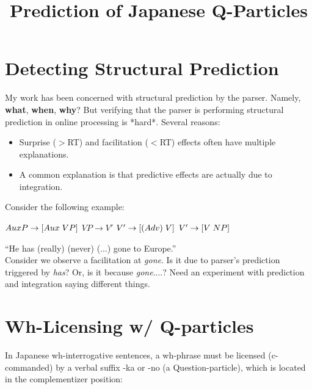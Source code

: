 \documentclass[12pt]{article}
\title{{\normalsize\bfseries {Prediction of Japanese Q-Particles}}}
\author{\normalsize\bfseries {}}
\date{}
\begin{document}
\maketitle

\section{Detecting Structural Prediction}
My work has been concerned with structural prediction by the parser. Namely,
\textbf{what}, \textbf{when}, \textbf{why}? But verifying that the parser is performing 
structural prediction in online processing is *hard*. Several reasons:

\begin{itemize}
    \item Surprise ($>$RT) and facilitation ($<$RT) effects often have multiple explanations.
    \item A common explanation is that predictive effects are actually due to integration.
\end{itemize}

\noindent
Consider the following example:
\begin{exe}
    \ex
    \begin{xlist}
        \ex $AuxP \rightarrow [Aux \hspace{0.1cm} VP]$
        \ex $VP \rightarrow V'$
        \ex $ V' \rightarrow  [(Adv) \hspace{0.1cm} V]$
        \ex $V'\rightarrow [V \hspace{0.1cm} NP]$
    \end{xlist}
\end{exe}
``He has (really) (never) (...) gone to Europe.''\\

\noindent
Consider we observe a facilitation at \textit{gone}. Is it due to parser's prediction triggered by
\textit{has}? Or, is it because \textit{gone}....? Need an experiment with prediction and integration
saying different things.



\section{Wh-Licensing w/ Q-particles}
In Japanese wh-interrogative sentences, a wh-phrase must be licensed (c-commanded)
by a verbal suffix -ka or -no (a Question-particle), which is located in the complementizer
position:
\end{document}
